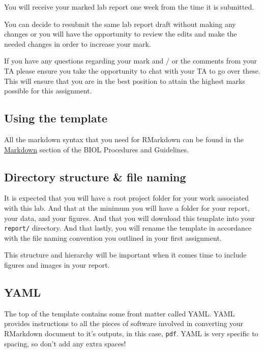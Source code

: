 \documentclass[
]{book}
\begin{document}
You will receive your marked lab report one week from the time it is submitted.

You can decide to resubmit the same lab report draft without making any changes or you will have the opportunity to review the edits and make the needed changes in order to increase your mark.

If you have any questions regarding your mark and / or the comments from your TA please ensure you take the opportunity to chat with your TA to go over these. This will ensure that you are in the best position to attain the highest marks possible for this assignment.

\hypertarget{using-the-template}{%
\subsection*{Using the template}\label{using-the-template}}

All the markdown syntax that you need for RMarkdown can be found in the \href{https://ubco-biology.github.io/Procedures-and-Guidelines/markdown-1.html}{Markdown} section of the BIOL Procedures and Guidelines.

\hypertarget{directory-structure-file-naming}{%
\subsection*{Directory structure \& file naming}\label{directory-structure-file-naming}}

It is expected that you will have a root project folder for your work associated with this lab. And that at the minimum you will have a folder for your report, your data, and your figures. And that you will download this template into your \texttt{report/} directory. And that lastly, you will rename the template in accordance with the file naming convention you outlined in your first assignment.

This structure and hierarchy will be important when it comes time to include figures and images in your report.

\hypertarget{yaml}{%
\subsection*{YAML}\label{yaml}}

The top of the template contains some front matter called YAML. YAML provides instructions to all the pieces of software involved in converting your RMarkdown document to it's outputs, in this case, \texttt{pdf}. YAML is very specific to spacing, so don't add any extra spaces!
\end{document}
